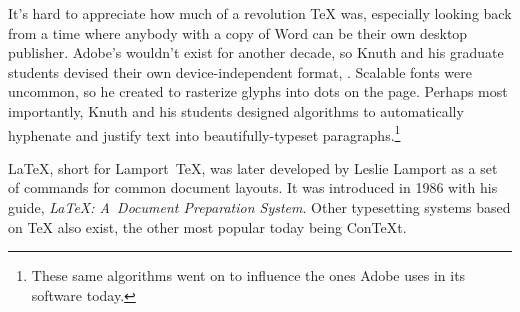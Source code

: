 It's hard to appreciate how much of a revolution \TeX{} was,
especially looking back from a time where anybody with a copy
of Word can be their own desktop publisher.
Adobe's  wouldn't exist for another decade, so Knuth
and his graduate students devised their own device-independent format,
.
Scalable fonts were uncommon, so he created \MF{} to rasterize glyphs
into dots on the page.
Perhaps most importantly, Knuth and his students designed algorithms
to automatically hyphenate and justify text into
beautifully-typeset paragraphs.\punckern\footnote{These same algorithms went
on to influence the ones Adobe uses in its software today.\punckern{}}

\LaTeX{}, short for Lamport~\TeX{}, was later developed by Leslie Lamport
as a set of commands for common document layouts.
It was introduced in 1986 with his guide,
\textit{\LaTeX: A~Document Preparation System}.
Other typesetting systems based on \TeX{} also exist,
the other most popular today being Con\TeX{}t.

